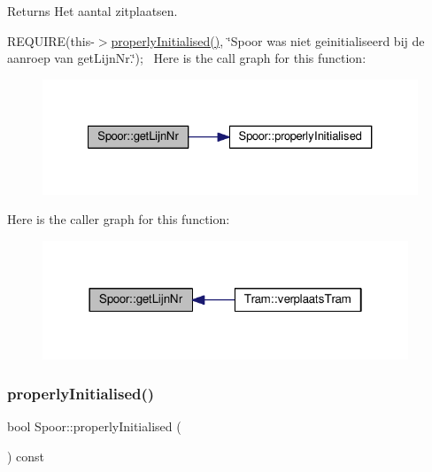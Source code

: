 \begin{DoxyReturn}{Returns}
Het aantal zitplaatsen.
\end{DoxyReturn}
R\+E\+Q\+U\+I\+RE(this-\/$>$\hyperlink{class_spoor_a1eb7c54228676cdb7c8620104e063a3c}{properly\+Initialised()}, \char`\"{}\+Spoor was niet geinitialiseerd bij de aanroep van get\+Lijn\+Nr.\char`\"{});~\newline
Here is the call graph for this function\+:
\nopagebreak
\begin{figure}[H]
\begin{center}
\leavevmode
\includegraphics[width=327pt]{class_spoor_a66ebc0abcb370b1509bd7b3961a8e45a_cgraph}
\end{center}
\end{figure}
Here is the caller graph for this function\+:
\nopagebreak
\begin{figure}[H]
\begin{center}
\leavevmode
\includegraphics[width=310pt]{class_spoor_a66ebc0abcb370b1509bd7b3961a8e45a_icgraph}
\end{center}
\end{figure}
\mbox{\label{class_spoor_a1eb7c54228676cdb7c8620104e063a3c}} 
\subsubsection{\texorpdfstring{properly\+Initialised()}{properlyInitialised()}}
{\footnotesize\ttfamily bool Spoor\+::properly\+Initialised (\begin{DoxyParamCaption}{ }\end{DoxyParamCaption}) const}



